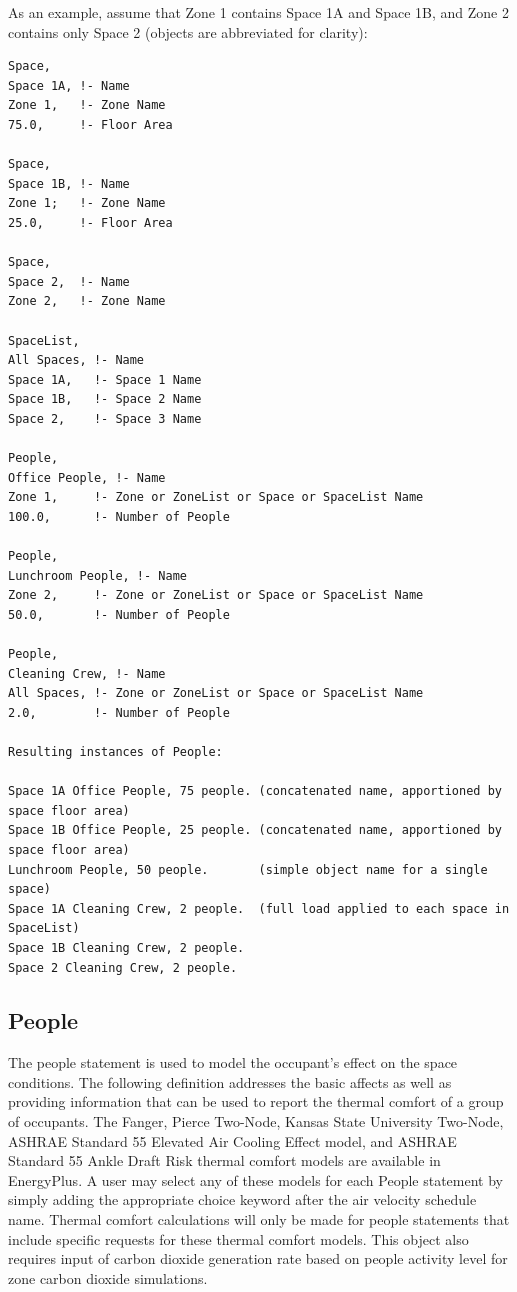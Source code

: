 As an example, assume that Zone 1 contains Space 1A and Space 1B, and Zone 2 contains only Space 2 (objects are abbreviated for clarity):
\begin{lstlisting}
Space,
Space 1A, !- Name
Zone 1,   !- Zone Name
75.0,     !- Floor Area

Space,
Space 1B, !- Name
Zone 1;   !- Zone Name
25.0,     !- Floor Area

Space,
Space 2,  !- Name
Zone 2,   !- Zone Name

SpaceList,
All Spaces, !- Name
Space 1A,   !- Space 1 Name
Space 1B,   !- Space 2 Name
Space 2,    !- Space 3 Name

People,
Office People, !- Name
Zone 1,     !- Zone or ZoneList or Space or SpaceList Name
100.0,      !- Number of People

People,
Lunchroom People, !- Name
Zone 2,     !- Zone or ZoneList or Space or SpaceList Name
50.0,       !- Number of People

People,
Cleaning Crew, !- Name
All Spaces, !- Zone or ZoneList or Space or SpaceList Name
2.0,        !- Number of People

Resulting instances of People:

Space 1A Office People, 75 people. (concatenated name, apportioned by space floor area)
Space 1B Office People, 25 people. (concatenated name, apportioned by space floor area)
Lunchroom People, 50 people.       (simple object name for a single space)
Space 1A Cleaning Crew, 2 people.  (full load applied to each space in SpaceList)
Space 1B Cleaning Crew, 2 people.
Space 2 Cleaning Crew, 2 people.

\end{lstlisting}


\subsection{People}\label{people}

The people statement is used to model the occupant's effect on the space conditions. The following definition addresses the basic affects as well as providing information that can be used to report the thermal comfort of a group of occupants. The Fanger, Pierce Two-Node, Kansas State University Two-Node, ASHRAE Standard 55 Elevated Air Cooling Effect model, and ASHRAE Standard 55 Ankle Draft Risk thermal comfort models are available in EnergyPlus. A user may select any of these models for each People statement by simply adding the appropriate choice keyword after the air velocity schedule name. Thermal comfort calculations will only be made for people statements that include specific requests for these thermal comfort models. This object also requires input of carbon dioxide generation rate based on people activity level for zone carbon dioxide simulations.

